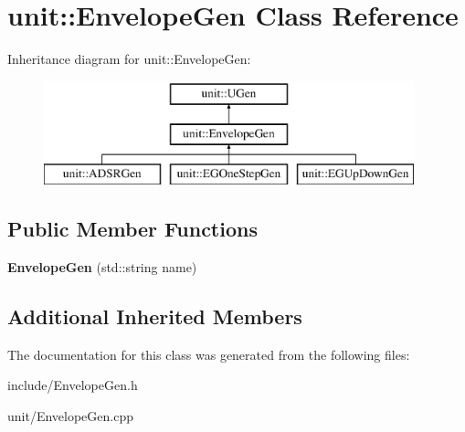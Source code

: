 \hypertarget{classunit_1_1EnvelopeGen}{}\section{unit\+:\+:Envelope\+Gen Class Reference}
\label{classunit_1_1EnvelopeGen}
Inheritance diagram for unit\+:\+:Envelope\+Gen\+:\begin{figure}[H]
\begin{center}
\leavevmode
\includegraphics[height=3.000000cm]{classunit_1_1EnvelopeGen}
\end{center}
\end{figure}
\subsection*{Public Member Functions}
\begin{DoxyCompactItemize}
\item 
{\bfseries Envelope\+Gen} (std\+::string name)\hypertarget{classunit_1_1EnvelopeGen_a2925f305c08e3316c3b1cbdabea03bde}{}\label{classunit_1_1EnvelopeGen_a2925f305c08e3316c3b1cbdabea03bde}

\end{DoxyCompactItemize}
\subsection*{Additional Inherited Members}


The documentation for this class was generated from the following files\+:\begin{DoxyCompactItemize}
\item 
include/Envelope\+Gen.\+h\item 
unit/Envelope\+Gen.\+cpp\end{DoxyCompactItemize}
